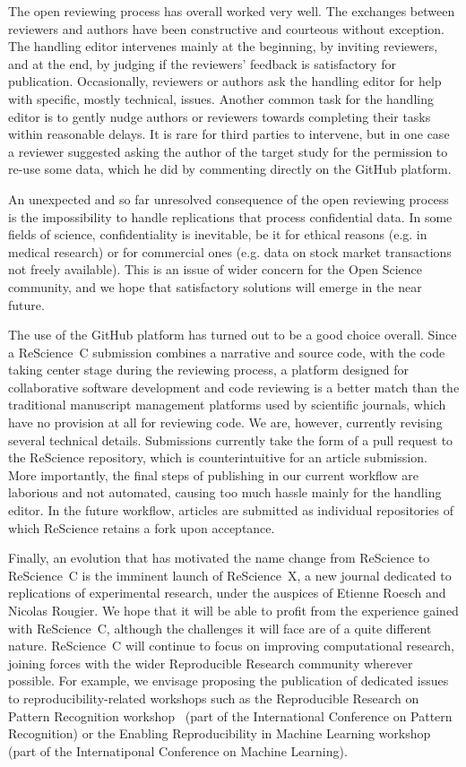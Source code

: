 \documentclass[runningheads]{llncs}
\begin{document}
The open reviewing process has overall worked very well. The exchanges between reviewers and authors have been constructive and courteous without exception. The handling editor intervenes mainly at the beginning, by inviting reviewers, and at the end, by judging if the reviewers' feedback is satisfactory for publication. Occasionally, reviewers or authors ask the handling editor for help with specific, mostly technical, issues. Another common task for the handling editor is to gently nudge authors or reviewers towards completing their tasks within reasonable delays. It is rare for third parties to intervene, but in one case a reviewer suggested asking the author of the target study for the permission to re-use some data, which he did by commenting directly on the GitHub platform.

An unexpected and so far unresolved consequence of the open reviewing process is the impossibility to handle replications that process confidential data. In some fields of science, confidentiality is inevitable, be it for ethical reasons (e.g. in medical research) or for commercial ones (e.g. data on stock market transactions not freely available). This is an issue of wider concern for the Open Science community, and we hope that satisfactory solutions will emerge in the near future.

The use of the GitHub platform has turned out to be a good choice overall. Since a ReScience~C submission combines a narrative and source code, with the code taking center stage during the reviewing process, a platform designed for collaborative software development and code reviewing is a better match than the traditional manuscript management platforms used by scientific journals, which have no provision at all for reviewing code. We are, however, currently revising several technical details. Submissions currently take the form of a pull request to the ReScience repository, which is counterintuitive for an article submission. More importantly, the final steps of publishing in our current workflow are laborious and not automated, causing too much hassle mainly for the handling editor. In the future workflow, articles are submitted as individual repositories of which ReScience retains a fork upon acceptance.

Finally, an evolution that has motivated the name change from ReScience to ReScience~C is the imminent launch of ReScience~X, a new journal dedicated to replications of experimental research, under the auspices of Etienne Roesch and Nicolas Rougier. We hope that it will be able to profit from the experience gained with ReScience~C, although the challenges it will face are of a quite different nature. ReScience~C will continue to focus on improving computational research, joining forces with the wider Reproducible Research community wherever possible. For example, we envisage proposing the publication of dedicated issues to reproducibility-related workshops such as the Reproducible Research on Pattern Recognition workshop~\cite{KerautretReproducibleResearchPattern2017} (part of the International Conference on Pattern Recognition) or the Enabling Reproducibility in Machine Learning workshop (part of the Internatiponal Conference on Machine Learning).

%
%


%
\end{document}
